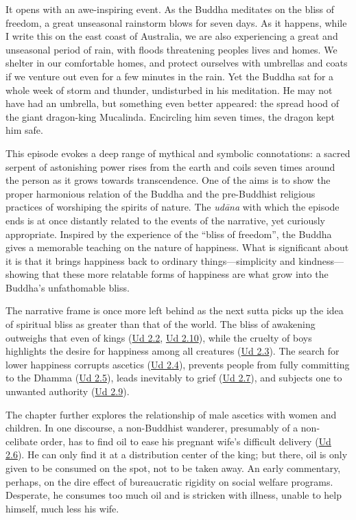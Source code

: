 \documentclass[12pt,openany]{book}%
\begin{document}
It opens with an awe-inspiring event. As the Buddha meditates on the bliss of freedom, a great unseasonal rainstorm blows for seven days. As it happens, while I write this on the east coast of Australia, we are also experiencing a great and unseasonal period of rain, with floods threatening peoples lives and homes. We shelter in our comfortable homes, and protect ourselves with umbrellas and coats if we venture out even for a few minutes in the rain. Yet the Buddha sat for a whole week of storm and thunder, undisturbed in his meditation. He may not have had an umbrella, but something even better appeared: the spread hood of the giant dragon-king Mucalinda. Encircling him seven times, the dragon kept him safe.

This episode evokes a deep range of mythical and symbolic connotations: a sacred serpent of astonishing power rises from the earth and coils seven times around the person as it grows towards transcendence. One of the aims is to show the proper harmonious relation of the Buddha and the pre-Buddhist religious practices of worshiping the spirits of nature. The \textit{\textsanskrit{udāna}} with which the episode ends is at once distantly related to the events of the narrative, yet curiously appropriate. Inspired by the experience of the “bliss of freedom”, the Buddha gives a memorable teaching on the nature of happiness. What is significant about it is that it brings happiness back to ordinary things—simplicity and kindness—showing that these more relatable forms of happiness are what grow into the Buddha’s unfathomable bliss.

The narrative frame is once more left behind as the next sutta picks up the idea of spiritual bliss as greater than that of the world. The bliss of awakening outweighs that even of kings (\href{https://suttacentral.net/ud2.2/en/sujato}{Ud 2.2}, \href{https://suttacentral.net/ud2.10/en/sujato}{Ud 2.10}), while the cruelty of boys highlights the desire for happiness among all creatures (\href{https://suttacentral.net/ud2.3/en/sujato}{Ud 2.3}). The search for lower happiness corrupts ascetics (\href{https://suttacentral.net/ud2.4/en/sujato}{Ud 2.4}), prevents people from fully committing to the Dhamma (\href{https://suttacentral.net/ud2.5/en/sujato}{Ud 2.5}), leads inevitably to grief (\href{https://suttacentral.net/ud2.7/en/sujato}{Ud 2.7}), and subjects one to unwanted authority (\href{https://suttacentral.net/ud2.9/en/sujato}{Ud 2.9}).

The chapter further explores the relationship of male ascetics with women and children. In one discourse, a non-Buddhist wanderer, presumably of a non-celibate order, has to find oil to ease his pregnant wife’s difficult delivery (\href{https://suttacentral.net/ud2.6/en/sujato}{Ud 2.6}). He can only find it at a distribution center of the king; but there, oil is only given to be consumed on the spot, not to be taken away. An early commentary, perhaps, on the dire effect of bureaucratic rigidity on social welfare programs. Desperate, he consumes too much oil and is stricken with illness, unable to help himself, much less his wife. 
\end{document}
